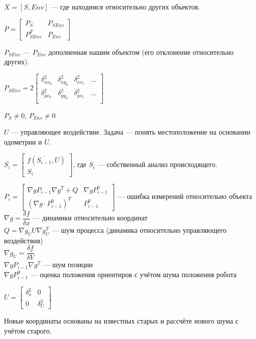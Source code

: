 \documentclass[12pt]{article}
\begin{document}
$X = [S, Env]$ — где находимся относительно других объектов.

$P =\begin{bmatrix}
        P_S        & P_{SEnv} \\
        P^T_{SEnv} & P_{Env}
    \end{bmatrix}$

$P_{SEnv}$ — $P_{Env}$ дополненная нашим объектом (его отклонение относительно других).

$P_{SEnv} = 2\begin{bmatrix}
        \delta^2_{xx_0} & \delta^2_{xy_0} & \delta^2_{xx_1} & ... \\
        \delta^2_{yx_0} & \delta^2_{yy_0} & \delta^2_{yx_1} & ... \\
    \end{bmatrix}$

$P_S \neq 0$, $P_{Env} \neq 0$

$U$ — управляющее воздействие. Задача — понять местоположение на основании одометрии и $U$.

$\overline{S_i} = \begin{bmatrix}
        f(\overline{S_{i-1}}, U) \\
        S_i
    \end{bmatrix}$, где $S_i$ — собственный анализ происходящего.

$P_i = \begin{bmatrix}
        \nabla g P_{i - 1} \nabla g^T + Q & \nabla g P_{i-1}^0 \\
        (\nabla g \cdot P_{i - 1}^0)^T    & P_{i - 1}^0
    \end{bmatrix}$ — ошибка измерений относительно объекта \\
$\nabla g = \dfrac{\delta f}{\delta x}$ — динамики относительно координат \\
$Q = \nabla g_U U \nabla g_U^T$ — шум процесса (динамика относительно управляющего воздействия) \\
$\nabla g_U = \dfrac{\delta f}{\delta V}$ \\
$\nabla g P_{i - 1} \nabla g^T$ — шум позиции \\
$\nabla g P_{i-1}^0$ — оценка положения ориентиров с учётом шума положения робота

$U = \begin{bmatrix}\delta^2_x & 0 \\ 0 & \delta^2_U\end{bmatrix}$

Новые координаты основаны на известных старых и рассчёте нового шума с учётом старого.
\end{document}
